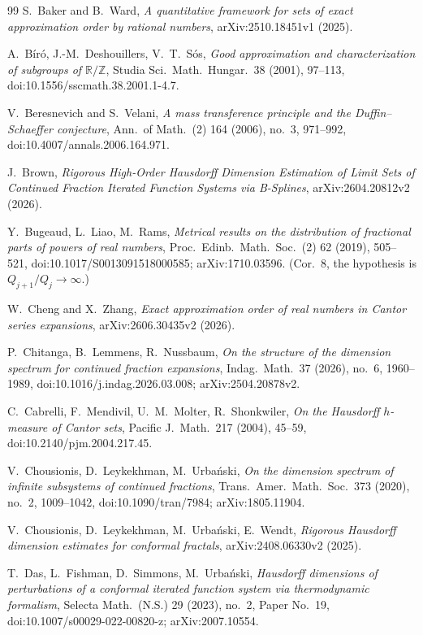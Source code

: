 \documentclass[11pt]{article}
\theoremstyle{definition}
\theoremstyle{remark}
\newcommand{\R}{\mathbb{R}}
\newcommand{\Z}{\mathbb{Z}}
\begin{document}
\begin{thebibliography}{99}
 S.~Baker and B.~Ward, \emph{A quantitative framework for sets of
exact approximation order by rational numbers}, arXiv:2510.18451v1 (2025).

 A.~B\'ir\'o, J.-M.~Deshouillers, V.~T.~S\'os, \emph{Good
approximation and characterization of subgroups of $\R/\Z$}, Studia Sci.\ Math.\ Hungar.\ 38 (2001), 97--113, doi:10.1556/sscmath.38.2001.1-4.7.

 V.~Beresnevich and S.~Velani, \emph{A mass transference principle
and the Duffin--Schaeffer conjecture}, Ann.\ of Math.\ (2) 164 (2006), no.~3, 971--992, doi:10.4007/annals.2006.164.971.

 J.~Brown, \emph{Rigorous High-Order Hausdorff Dimension
Estimation of Limit Sets of Continued Fraction Iterated Function Systems via B-Splines},
arXiv:2604.20812v2 (2026).

 Y.~Bugeaud, L.~Liao, M.~Rams, \emph{Metrical results on the
distribution of fractional parts of powers of real numbers}, Proc.\ Edinb.\ Math.\ Soc.\ (2) 62 (2019), 505--521, doi:10.1017/S0013091518000585; arXiv:1710.03596. (Cor.~8, the hypothesis is $Q_{j+1}/Q_j\to\infty$.)

 W.~Cheng and X.~Zhang, \emph{Exact approximation order of real numbers in
Cantor series expansions}, arXiv:2606.30435v2 (2026).

 P.~Chitanga, B.~Lemmens, R.~Nussbaum, \emph{On the structure of
the dimension spectrum for continued fraction expansions}, Indag.\ Math.\ 37 (2026),
no.~6, 1960--1989, doi:10.1016/j.indag.2026.03.008; arXiv:2504.20878v2.

 C.~Cabrelli, F.~Mendivil, U.~M.~Molter, R.~Shonkwiler,
\emph{On the Hausdorff $h$-measure of Cantor sets}, Pacific J.\ Math.\ 217
(2004), 45--59, doi:10.2140/pjm.2004.217.45.

 V.~Chousionis, D.~Leykekhman, M.~Urba\'nski, \emph{On the
dimension spectrum of infinite subsystems of continued fractions}, Trans.\ Amer.\ Math.\ Soc.\ 373 (2020), no.~2, 1009--1042, doi:10.1090/tran/7984; arXiv:1805.11904.

 V.~Chousionis, D.~Leykekhman, M.~Urba\'nski, E.~Wendt,
\emph{Rigorous Hausdorff dimension estimates for conformal fractals},
arXiv:2408.06330v2 (2025).

{\sloppy
{} T.~Das, L.~Fishman, D.~Simmons, M.~Urba\'nski, \emph{Hausdorff
dimensions of perturbations of a conformal iterated function system via
thermodynamic formalism}, Selecta Math.\ (N.S.) 29 (2023), no.~2, Paper No.~19,
doi:10.1007/s00029-022-00820-z; arXiv:2007.10554.
}


\end{thebibliography}
\end{document}

